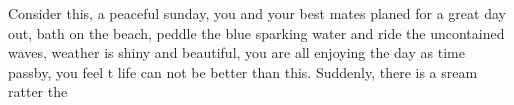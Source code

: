 Consider this, a peaceful sunday, you and your best mates planed for a great day out, bath on the beach, peddle the blue sparking water and ride the uncontained waves, weather is shiny and beautiful, you are all enjoying the day as time passby, you feel t life can not be better than this. Suddenly, there is a sream ratter the 